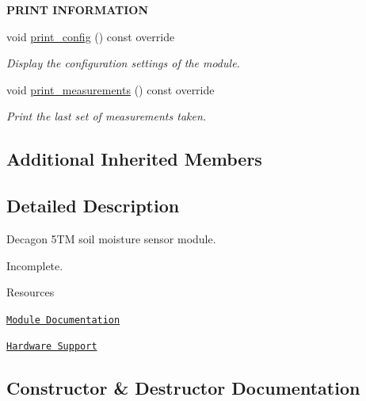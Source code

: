 \begin{Indent}{\bf P\+R\+I\+NT I\+N\+F\+O\+R\+M\+A\+T\+I\+ON}\par
\begin{DoxyCompactItemize}
\item 
void \hyperlink{class_loom___decagon5_t_m_ac402bf4f4ea1e26d9ac38b0572ceade6}{print\+\_\+config} () const override
\begin{DoxyCompactList}\small\item\em Display the configuration settings of the module. \end{DoxyCompactList}\item 
void \hyperlink{class_loom___decagon5_t_m_a2fa519e7787d482a5bdb50ed38e42c33}{print\+\_\+measurements} () const override
\begin{DoxyCompactList}\small\item\em Print the last set of measurements taken. \end{DoxyCompactList}\end{DoxyCompactItemize}
\end{Indent}
\subsection*{Additional Inherited Members}


\subsection{Detailed Description}
Decagon 5\+TM soil moisture sensor module. 

Incomplete.

\begin{DoxyParagraph}{Resources}

\begin{DoxyItemize}
\item \href{https://openslab-osu.github.io/Loom/html/class_loom___decagon5_t_m.html}{\tt Module Documentation}
\item \href{https://github.com/OPEnSLab-OSU/Loom/wiki/Hardware-Support#sdi-12-sensors}{\tt Hardware Support} 
\end{DoxyItemize}
\end{DoxyParagraph}


\subsection{Constructor \& Destructor Documentation}
